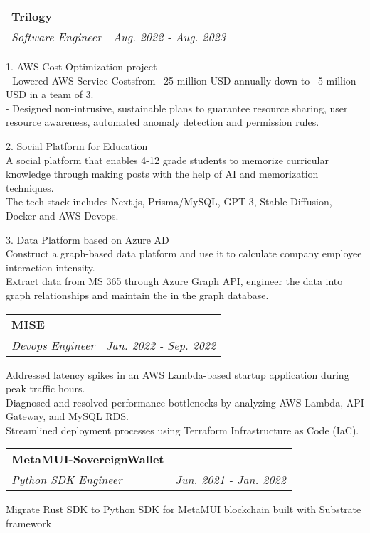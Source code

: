 \documentclass[letterpaper,11pt]{article}
\makeatletter
\renewenvironment{itemize}{
  \begin{list}{}{
    \setlength{\leftmargin}{0.6em}
    \setlength{\textwidth}{7.5in}
    \setlength{\topmargin}{-0.6in}
    \setlength{\textheight}{19.5in}
  }
}{
  \end{list}
}
\newcommand{\resitem}[1]{\item #1 \vspace{-2pt}}
\newcommand{\ressubheading}[4]{
\begin{tabular*}{6.5in}{l@{\extracolsep{\fill}}r}
		\textbf{#1} & #2 \\
		\textit{#3} & \textit{#4} \\
\end{tabular*}\vspace{-8.5pt}} %
\makeatother
\begin{document}
\begin{itemize}
	\ressubheading{Trilogy}{}{Software Engineer}{Aug. 2022 - Aug. 2023}
	\begin{itemize}
		\resitem{
1. AWS Cost Optimization project\\
- Lowered AWS Service Costsfrom ~25 million USD annually down to ~5 million USD in a team of 3. \\
- Designed non-intrusive, sustainable plans to guarantee resource sharing, user resource awareness, automated anomaly detection and permission rules. \\
		}
		\resitem{
2. Social Platform for Education\\
A social platform that enables 4-12 grade students to memorize curricular knowledge through making posts with the help of AI and memorization techniques.\\
The tech stack includes Next.js, Prisma/MySQL, GPT-3, Stable-Diffusion, Docker and AWS Devops.\\
		}
		\resitem{
3. Data Platform based on Azure AD\\
Construct a graph-based data platform and use it to calculate company employee interaction intensity.\\
Extract data from MS 365 through Azure Graph API, engineer the data into graph relationships and maintain the in the graph database.\\
		}
	\end{itemize}
	\ressubheading{MISE}{}{Devops Engineer}{Jan. 2022 - Sep. 2022}
	\begin{itemize}
		\resitem{
Addressed latency spikes in an AWS Lambda-based startup application during peak traffic hours.\\
Diagnosed and resolved performance bottlenecks by analyzing AWS Lambda, API Gateway, and MySQL RDS.\\
Streamlined deployment processes using Terraform Infrastructure as Code (IaC).\\
			}
	\end{itemize}
	\ressubheading{MetaMUI-SovereignWallet}{}{Python SDK Engineer}{Jun. 2021 - Jan. 2022}
	\begin{itemize}
		\resitem{
Migrate Rust SDK to Python SDK for MetaMUI blockchain built with Substrate framework\\
			}
	\end{itemize}
\end{itemize}
\end{document}

